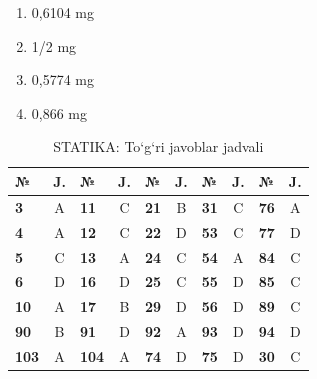 \begin{enumerate}

\begin{enumerate}[label=\Alph*)]
\item 0,6104 mg
\item 1/2 mg
\item 0,5774 mg
\item 0,866 mg
\end{enumerate}

\end{enumerate}





\begin{table}[h!]
\centering
\caption{STATIKA: To‘g‘ri javoblar jadvali}
\begin{tabular}{|l|c|l|c|l|c|l|c|l|c|}
\hline
\textbf{№} & \textbf{J.} & \textbf{№} & \textbf{J.} & \textbf{№} & \textbf{J.} & \textbf{№} & \textbf{J.} & \textbf{№} & \textbf{J.} \\ \hline
\textbf{3}  & A & \textbf{11} & C & \textbf{21} & B & \textbf{31} & C & \textbf{76} & A \\ \hline
\textbf{4}  & A & \textbf{12} & C & \textbf{22} & D & \textbf{53} & C & \textbf{77} & D \\ \hline
\textbf{5}  & C & \textbf{13} & A & \textbf{24} & C & \textbf{54} & A & \textbf{84} & C \\ \hline
\textbf{6}  & D & \textbf{16} & D & \textbf{25} & C & \textbf{55} & D & \textbf{85} & C \\ \hline
\textbf{10} & A & \textbf{17} & B & \textbf{29} & D & \textbf{56} & D & \textbf{89} & C \\ \hline
\textbf{90} & B & \textbf{91} & D & \textbf{92} & A & \textbf{93} & D & \textbf{94} & D \\ \hline
\textbf{103} & A & \textbf{104} & A & \textbf{74} & D & \textbf{75} & D & \textbf{30} & C \\ \hline
\end{tabular}
\end{table}